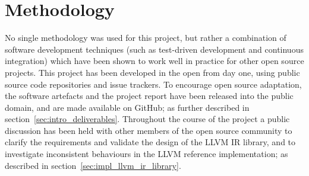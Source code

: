 

\section{Methodology}
\label{sec:methodology}

No single methodology was used for this project, but rather a combination of software development techniques (such as test-driven development and continuous integration) which have been shown to work well in practice for other open source projects. This project has been developed in the open from day one, using public source code repositories and issue trackers. To encourage open source adaptation, the software artefacts and the project report have been released into the public domain, and are made available on GitHub; as further described in section~\ref{sec:intro_deliverables}. Throughout the course of the project a public discussion has been held with other members of the open source community to clarify the requirements and validate the design of the LLVM IR library, and to investigate inconsistent behaviours in the LLVM reference implementation; as described in section~\ref{sec:impl_llvm_ir_library}.




